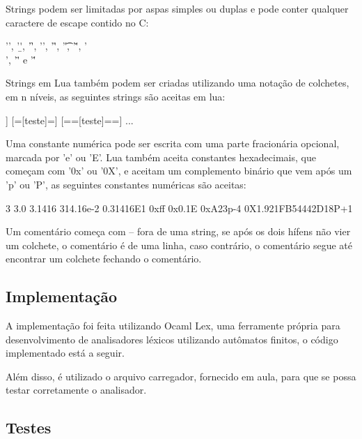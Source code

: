 \documentclass[12pt,a4paper,twoside]{report}
\begin{document}
Strings podem ser limitadas por aspas simples ou duplas e pode conter qualquer caractere de escape contido no C:

\begin{terminal}
 '\a', '\b', '\f', '\n', '\r', '\t', '\v', '\\', '\"' e '\''
\end{terminal}

Strings em Lua também podem ser criadas utilizando uma notação de colchetes, em n níveis, as seguintes strings são aceitas em lua:

\begin{terminal}
 [[teste]] [=[teste]=] [==[teste]==] ...
\end{terminal}

Uma constante numérica pode ser escrita com uma parte fracionária opcional, marcada por 'e' ou 'E'. Lua também aceita constantes hexadecimais, que começam com '0x' ou '0X', e aceitam um complemento binário que vem após um 'p' ou 'P', as seguintes constantes numéricas são aceitas:

\begin{terminal}
 3     3.0     3.1416     314.16e-2     0.31416E1
 0xff  0x0.1E  0xA23p-4   0X1.921FB54442D18P+1
\end{terminal}

Um comentário começa com -- fora de uma string, se após os dois hífens não vier um colchete, o comentário é de uma linha, caso contrário, o comentário segue até encontrar um colchete fechando o comentário.

\subsection{Implementação}

A implementação foi feita utilizando Ocaml Lex, uma ferramente própria para desenvolvimento de analisadores léxicos utilizando autômatos finitos, o código implementado está a seguir.



Além disso, é utilizado o arquivo carregador, fornecido em aula, para que se possa testar corretamente o analisador.



\subsection{Testes}
\end{document}
